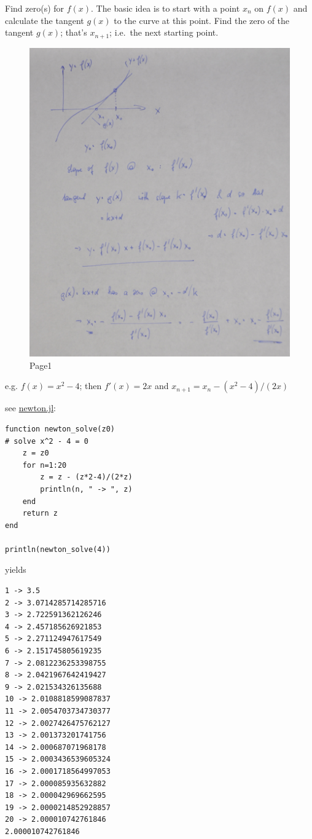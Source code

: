 
Find zero(s) for \(f(x)\). The basic idea is to start with a point
\(x_n\) on \(f(x)\) and calculate the tangent \(g(x)\) to the curve at
this point. Find the zero of the tangent \(g(x)\); that's \(x_{n+1}\);
i.e.~the next starting point.

\begin{figure}[hbt!]
\centering
\includegraphics[scale=1.5]{images/DSC_0001_small.JPG}
\caption{Page1}
\end{figure}

e.g. \(f(x) = x^2-4\); then \(f'(x) = 2x\) and
\(x_{n+1} = x_n - (x^2-4)/(2x)\)

see
\href{file:///home/cnovak/src/julia/JuliaStuff/newton.jl}{newton.jl}:

\begin{verbatim}
function newton_solve(z0)
# solve x^2 - 4 = 0
    z = z0
    for n=1:20
        z = z - (z*2-4)/(2*z)
        println(n, " -> ", z)
    end
    return z
end

println(newton_solve(4))
\end{verbatim}

yields

\begin{verbatim}
1 -> 3.5
2 -> 3.0714285714285716
3 -> 2.722591362126246
4 -> 2.457185626921853
5 -> 2.271124947617549
6 -> 2.151745805619235
7 -> 2.0812236253398755
8 -> 2.0421967642419427
9 -> 2.021534326135688
10 -> 2.0108818599087837
11 -> 2.0054703734730377
12 -> 2.0027426475762127
13 -> 2.001373201741756
14 -> 2.000687071968178
15 -> 2.0003436539605324
16 -> 2.0001718564997053
17 -> 2.000085935632882
18 -> 2.000042969662595
19 -> 2.0000214852928857
20 -> 2.000010742761846
2.000010742761846
\end{verbatim}
